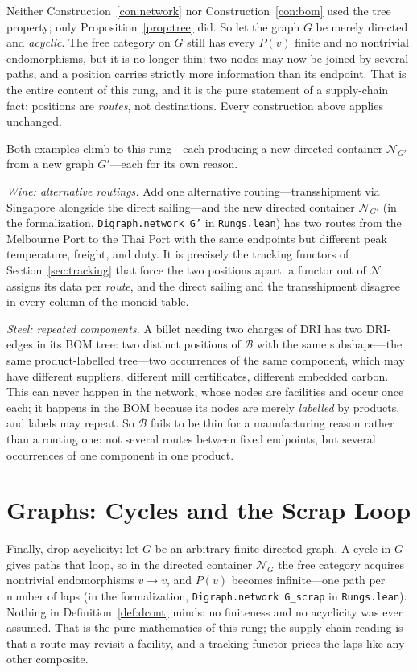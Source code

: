 \documentclass[11pt,a4paper]{article}
\newcommand{\N}{\mathcal{N}}
\newcommand{\B}{\mathcal{B}}
\theoremstyle{plain}
\theoremstyle{definition}
\theoremstyle{remark}
\begin{document}
Neither Construction~\ref{con:network} nor
Construction~\ref{con:bom} used the tree property; only
Proposition~\ref{prop:tree} did. So let the graph $G$ be merely
directed and \emph{acyclic}. The free category on $G$ still has
every $P(v)$ finite and no nontrivial endomorphisms, but it is no
longer thin: two nodes may now be joined by several paths, and a
position carries strictly more information than its endpoint. That
is the entire content of this rung, and it is the pure statement
of a supply-chain fact: positions are \emph{routes}, not
destinations. Every construction above applies unchanged.

Both examples climb to this rung---each producing a new directed
container $\N_{G'}$ from a new graph $G'$---each for its own reason.

\emph{Wine: alternative routings.} Add one alternative
routing---transshipment via Singapore alongside the direct
sailing---and the new directed container $\N_{G'}$ (in the
formalization, \texttt{Digraph.network G'} in \texttt{Rungs.lean}) has
two routes from the Melbourne Port to the
Thai Port with the same endpoints but different peak temperature,
freight, and duty. It is precisely the tracking functors of
Section~\ref{sec:tracking} that force the two positions apart: a
functor out of $\N$ assigns its data per \emph{route}, and the
direct sailing and the transshipment disagree in every column of
the monoid table.

\emph{Steel: repeated components.} A billet needing two charges of
DRI has two DRI-edges in its BOM tree: two distinct positions of
$\B$ with the same subshape---the same product-labelled
tree---two occurrences of the same component, which may have
different suppliers, different mill certificates, different
embedded carbon. This can never happen in the network, whose
nodes are facilities and occur once each; it happens in the BOM
because its nodes are merely \emph{labelled} by products, and
labels may repeat. So $\B$ fails to be thin
for a manufacturing reason rather than a routing one: not several
routes between fixed endpoints, but several occurrences of one
component in one product.

\section{Graphs: Cycles and the Scrap Loop}\label{sec:graph}

Finally, drop acyclicity: let $G$ be an arbitrary finite directed
graph. A cycle in $G$ gives paths that loop, so in the directed
container $\N_G$ the free category
acquires nontrivial endomorphisms $v \to v$, and $P(v)$
becomes infinite---one path per number of laps
(in the formalization, \texttt{Digraph.network G\_scrap} in
\texttt{Rungs.lean}). Nothing in
Definition~\ref{def:dcont} minds: no finiteness and no acyclicity
was ever assumed. That is the pure mathematics of this rung; the
supply-chain reading is that a route may revisit a facility, and a
tracking functor prices the laps like any other composite.
\end{document}
